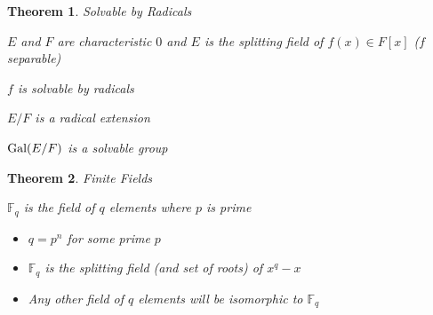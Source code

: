 \documentclass[12pt]{Qual}
\newtheorem{theorem}{Theorem}
\begin{document}
\begin{theorem}{\Large\textit{Solvable by Radicals}}

 \begin{minipage}{0.85\textwidth}
\vspace{0.45cm}
 $E$ and $F$ are characteristic $0$ and $E$ is the splitting field of $f(x)\in F[x]$ ($f$ separable)
\end{minipage}


\begin{minipage}{0.2\textwidth}
$f$ is solvable by radicals
\end{minipage}\hspace{0.35cm}\boxed{\iff}\hspace{0.35cm}\begin{minipage}{0.2\textwidth}
$E/F$ is a radical extension
\end{minipage}\hspace{0.35cm}\boxed{\iff}\hspace{0.45cm}\begin{minipage}{0.2\textwidth}
$\text{Gal}(E/F)$ is a solvable group
\end{minipage}

\end{theorem}
\vspace{0.5cm}
\begin{theorem}{\Large\textit{Finite Fields}}

 $\mathbb{F}_q$ is the field of $q$ elements where $p$ is prime


\begin{itemize}[leftmargin=3cm]
\renewcommand\labelitemi{\faPuzzlePiece}
    \item $q=p^n$ for some prime $p$
    \item $\mathbb{F}_q$ is the splitting field (and set of roots) of $x^q-x$
    \item Any other field of $q$ elements will be isomorphic to $\mathbb{F}_q$
\end{itemize}

\end{theorem}
\vspace{0.5cm}
\newpage
\end{document}
